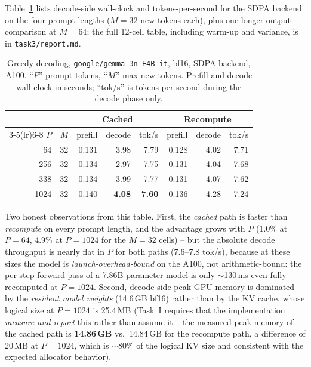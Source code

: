 \documentclass[conference]{IEEEtran}
\newcommand{\code}[1]{\texttt{\small #1}}
\newcommand{\modelname}{\texttt{google/gemma-3n-E4B-it}}
\begin{document}
Table~\ref{tab:kv} lists decode-side wall-clock and
tokens-per-second for the SDPA backend on the four prompt
lengths ($M=32$ new tokens each), plus one longer-output
comparison at $M=64$; the full 12-cell table, including warm-up
and variance, is in \code{task3/report.md}.

\begin{table}[t]
\caption{Greedy decoding, \modelname{}, bf16, SDPA backend,
A100. ``$P$'' prompt tokens, ``$M$'' max new tokens. Prefill and
decode wall-clock in seconds; ``tok/s'' is
tokens-per-second during the decode phase only.}
\label{tab:kv}
\centering
\small
\begin{tabular}{rrrrrrrr}
\toprule
& & \multicolumn{3}{c}{\textbf{Cached}} &
\multicolumn{3}{c}{\textbf{Recompute}}\\
\cmidrule(lr){3-5}\cmidrule(lr){6-8}
$P$ & $M$ & prefill & decode & tok/s & prefill & decode & tok/s\\
\midrule
64 & 32 & 0.131 & 3.98 & 7.79 & 0.128 & 4.02 & 7.71\\
256 & 32 & 0.134 & 2.97 & 7.75 & 0.131 & 4.04 & 7.68\\
338 & 32 & 0.134 & 3.99 & 7.77 & 0.131 & 4.07 & 7.62\\
1024 & 32 & 0.140 & \textbf{4.08} & \textbf{7.60} & 0.136 & 4.28 & 7.24\\
\bottomrule
\end{tabular}
\end{table}

Two honest observations from this table. First, the
\emph{cached} path is faster than \emph{recompute} on every
prompt length, and the advantage grows with $P$ (1.0\% at
$P=64$, 4.9\% at $P=1024$ for the $M=32$ cells) -- but the
absolute decode throughput is nearly flat in $P$ for both
paths (7.6--7.8 tok/s), because at these sizes the model is
\emph{launch-overhead-bound} on the A100, not arithmetic-bound:
the per-step forward pass of a 7.86B-parameter model is only
$\sim$130\,ms even fully recomputed at $P=1024$.
Second, decode-side peak GPU memory is dominated by the
\emph{resident model weights} (14.6\,GB bf16) rather than by the
KV cache, whose logical size at $P=1024$ is 25.4\,MB
(Task~I requires that the implementation \emph{measure and
report} this rather than assume it -- the measured peak memory
of the cached path is \textbf{14.86\,GB} vs.\ 14.84\,GB for the
recompute path, a difference of 20\,MB at $P=1024$, which is
$\sim$80\% of the logical KV size and consistent with the
expected allocator behavior).
\end{document}
